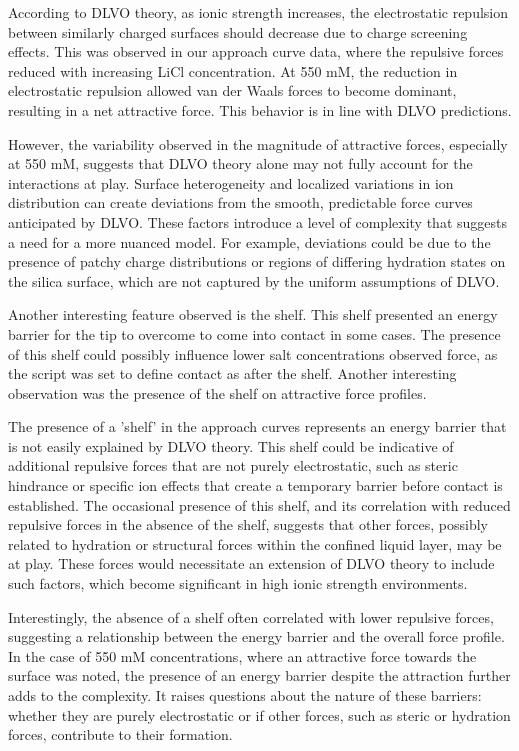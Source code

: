According to DLVO theory, as ionic strength increases, the electrostatic repulsion between similarly charged surfaces should decrease due to charge screening effects. This was observed in our approach curve data, where the repulsive forces reduced with increasing LiCl concentration. At 550 mM, the reduction in electrostatic repulsion allowed van der Waals forces to become dominant, resulting in a net attractive force. This behavior is in line with DLVO predictions.

However, the variability observed in the magnitude of attractive forces, especially at 550 mM, suggests that DLVO theory alone may not fully account for the interactions at play. Surface heterogeneity and localized variations in ion distribution can create deviations from the smooth, predictable force curves anticipated by DLVO. These factors introduce a level of complexity that suggests a need for a more nuanced model. For example, deviations could be due to the presence of patchy charge distributions or regions of differing hydration states on the silica surface, which are not captured by the uniform assumptions of DLVO.

Another interesting feature observed is the shelf. This shelf presented an energy barrier for the tip to overcome to come into contact in some cases. The presence of this shelf could possibly influence lower salt concentrations observed force, as the script was set to define contact as after the shelf. Another interesting observation was the presence of the shelf on attractive force profiles.

The presence of a 'shelf' in the approach curves represents an energy barrier that is not easily explained by DLVO theory. This shelf could be indicative of additional repulsive forces that are not purely electrostatic, such as steric hindrance or specific ion effects that create a temporary barrier before contact is established. The occasional presence of this shelf, and its correlation with reduced repulsive forces in the absence of the shelf, suggests that other forces, possibly related to hydration or structural forces within the confined liquid layer, may be at play. These forces would necessitate an extension of DLVO theory to include such factors, which become significant in high ionic strength environments.

Interestingly, the absence of a shelf often correlated with lower repulsive forces, suggesting a relationship between the energy barrier and the overall force profile. In the case of 550 mM concentrations, where an attractive force towards the surface was noted, the presence of an energy barrier despite the attraction further adds to the complexity. It raises questions about the nature of these barriers: whether they are purely electrostatic or if other forces, such as steric or hydration forces, contribute to their formation. 

